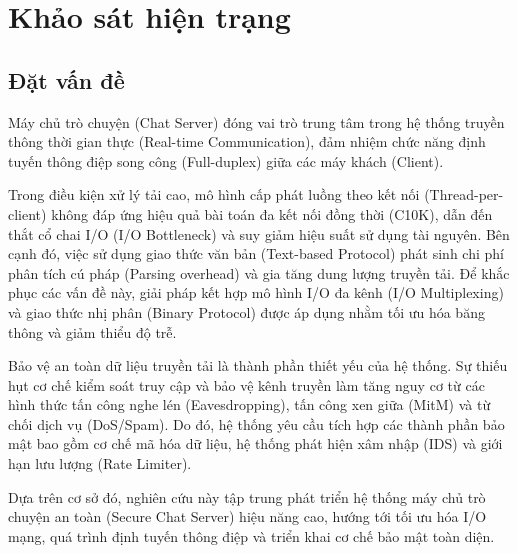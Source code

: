 \section{Khảo sát hiện trạng}

\subsection{Đặt vấn đề}

Máy chủ trò chuyện (Chat Server) đóng vai trò trung tâm trong hệ thống truyền thông thời gian thực (Real-time Communication), đảm nhiệm chức năng định tuyến thông điệp song công (Full-duplex) giữa các máy khách (Client).

Trong điều kiện xử lý tải cao, mô hình cấp phát luồng theo kết nối (Thread-per-client) không đáp ứng hiệu quả bài toán đa kết nối đồng thời (C10K), dẫn đến thắt cổ chai I/O (I/O Bottleneck) và suy giảm hiệu suất sử dụng tài nguyên. Bên cạnh đó, việc sử dụng giao thức văn bản (Text-based Protocol) phát sinh chi phí phân tích cú pháp (Parsing overhead) và gia tăng dung lượng truyền tải. Để khắc phục các vấn đề này, giải pháp kết hợp mô hình I/O đa kênh (I/O Multiplexing) và giao thức nhị phân (Binary Protocol) được áp dụng nhằm tối ưu hóa băng thông và giảm thiểu độ trễ.

Bảo vệ an toàn dữ liệu truyền tải là thành phần thiết yếu của hệ thống. Sự thiếu hụt cơ chế kiểm soát truy cập và bảo vệ kênh truyền làm tăng nguy cơ từ các hình thức tấn công nghe lén (Eavesdropping), tấn công xen giữa (MitM) và từ chối dịch vụ (DoS/Spam). Do đó, hệ thống yêu cầu tích hợp các thành phần bảo mật bao gồm cơ chế mã hóa dữ liệu, hệ thống phát hiện xâm nhập (IDS) và giới hạn lưu lượng (Rate Limiter).

Dựa trên cơ sở đó, nghiên cứu này tập trung phát triển hệ thống máy chủ trò chuyện an toàn (Secure Chat Server) hiệu năng cao, hướng tới tối ưu hóa I/O mạng, quá trình định tuyến thông điệp và triển khai cơ chế bảo mật toàn diện.


